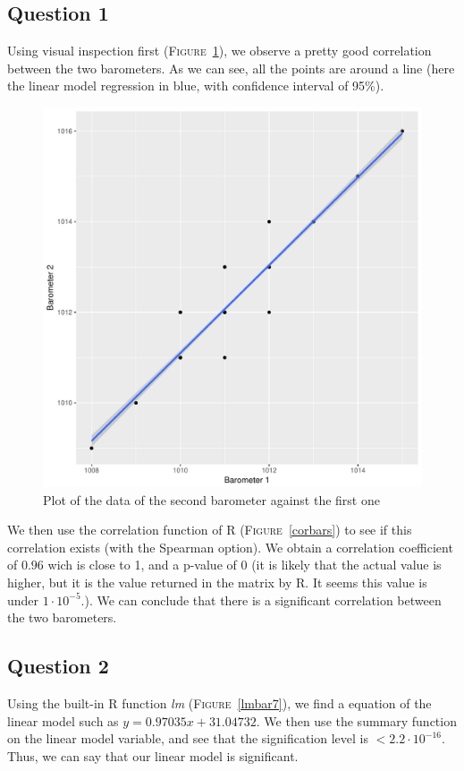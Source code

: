\documentclass[12pt,a4paper]{article}
\begin{document}
\subsection*{Question 1}
Using visual inspection first (\textsc{Figure}~\ref{corr3}), we observe a pretty good correlation between the two barometers. As we can see, all the points are around a line (here the linear model regression in blue, with confidence interval of 95\%).\\

\begin{figure}
  \begin{center}
    \includegraphics[width=0.6\linewidth]{corr3.pdf}
    \caption{Plot of the data of the second barometer against the first one}
    \label{corr3}
  \end{center}
\end{figure}

We then use the correlation function of R (\textsc{Figure}~\ref{corbars}) to see if this correlation exists (with the Spearman option). We obtain a correlation coefficient of $0.96$ wich is close to 1, and a p-value of 0 (it is likely that the actual value is higher, but it is the value returned in the matrix by R. It seems this value is under $1\cdot 10^{-5}$.). We can conclude that there is a significant correlation between the two barometers.

\subsection*{Question 2}
Using the built-in R function \textit{lm} (\textsc{Figure}~\ref{lmbar7}), we find a equation of the linear model such as $y = 0.97035x + 31.04732$. We then use the summary function on the linear model variable, and see that the signification level is $<2.2 \cdot 10^{-16}$. Thus, we can say that our linear model is significant.
\end{document}
